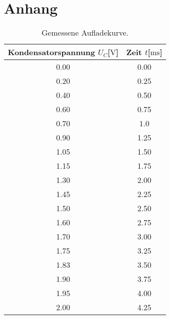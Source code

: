 \section{Anhang}

\begin{table}
    \centering
    \caption{Gemessene Aufladekurve.}
    \label{tab:aufladen}
    \begin{tabular}{c c}
        \toprule
        Kondensatorspannung $U_{C}$[$\si{\volt}$] & Zeit $t$[$\si{\milli\second}$] \\
        \midrule
        0.00     &     0.00\\
        0.20     &    0.25\\
        0.40     &    0.50\\
        0.60     &    0.75\\
        0.70     &    1.0\\
        0.90     &    1.25\\
        1.05     &   1.50\\
        1.15     &   1.75\\   
        1.30     &    2.00\\
        1.45     &   2.25\\  
        1.50     &    2.50\\
        1.60     &    2.75\\
        1.70     &    3.00\\
        1.75     &   3.25\\  
        1.83     &  3.50\\
        1.90     &    3.75\\
        1.95     &   4.00\\
        2.00     &      4.25\\
        \bottomrule
    \end{tabular}
    \end{table}

